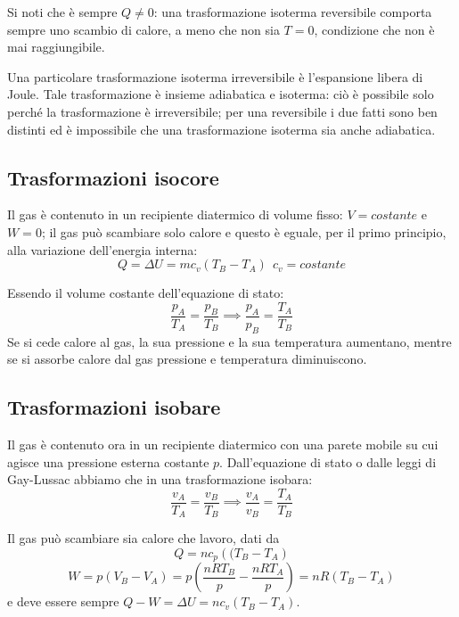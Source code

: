 \documentclass[class=book, crop=false, oneside, 12pt]{standalone}
\begin{document}
Si noti che è sempre \(Q \neq 0\): una trasformazione isoterma reversibile comporta sempre uno scambio di calore, a meno che non sia \(T = 0\), condizione che non è mai raggiungibile. 

Una particolare trasformazione isoterma irreversibile è l'espansione libera di Joule. 
Tale trasformazione è insieme adiabatica e isoterma: ciò è possibile solo perché la trasformazione è irreversibile; per una reversibile i due fatti sono ben distinti ed è impossibile che una trasformazione isoterma sia anche adiabatica.

\subsection{Trasformazioni isocore}

Il gas è contenuto in un recipiente diatermico di volume fisso: \(V = costante\) e \(W = 0\); il gas può scambiare solo calore e questo è eguale, per il primo principio, alla variazione dell'energia interna:
\begin{equation*}
    Q = \Delta U = m c_v (T_B - T_A) \ \  c_v = costante
\end{equation*}

Essendo il volume costante dell'equazione di stato:
\begin{equation*}
    \frac{p_A}{T_A} = \frac{p_B}{T_B} \implies \frac{p_A}{p_B} = \frac{T_A}{T_B}
\end{equation*}
Se si cede calore al gas, la sua pressione e la sua temperatura aumentano, mentre se si assorbe calore dal gas pressione e temperatura diminuiscono.

\subsection{Trasformazioni isobare}

Il gas è contenuto ora in un recipiente diatermico con una parete mobile su cui agisce una pressione esterna costante \(p\).
Dall'equazione di stato o dalle leggi di Gay-Lussac abbiamo che in una trasformazione isobara:
\begin{equation*}
    \frac{v_A}{T_A} = \frac{v_B}{T_B} \implies \frac{v_A}{v_B} = \frac{T_A}{T_B}
\end{equation*}

Il gas può scambiare sia calore che lavoro, dati da 
\begin{equation*}
    Q = n c_p \left((T_B - T_A\right)
\end{equation*}
\begin{equation*}
    W = p (V_B - V_A) = p \left(\frac{n R T_B}{p} - \frac{n R T_A}{p}\right) = n R \left(T_B - T_A\right) 
\end{equation*}
e deve essere sempre \(Q - W = \Delta U = n c_v (T_B - T_A)\).
\end{document}
